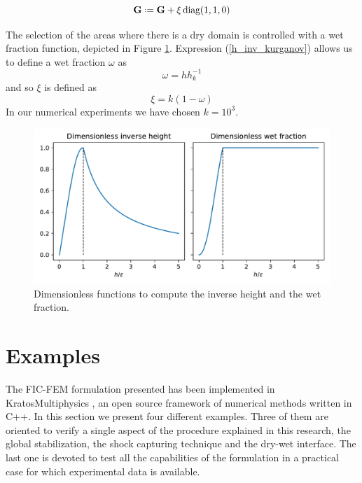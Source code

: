 \documentclass[a4paper,12pt]{elsarticle}
\newcommand{\defeq}{\mathrel{\vcenter{\baselineskip0.5ex\lineskiplimit0pt\hbox{\scriptsize.}\hbox{\scriptsize.}}}=}
\begin{document}
\begin{equation}
\mathbf{G} \defeq \mathbf{G} + \xi\,\text{diag}(1, 1, 0)
\end{equation}

The selection of the areas where there is a dry domain is controlled with a wet fraction function, depicted in Figure \ref{inverse_heihgt}. Expression (\ref{h_inv_kurganov}) allows us to define a wet fraction $\omega$ as
\begin{equation}
\omega = hh^{-1}_k
\end{equation}
and so $\xi$ is defined as
\begin{equation}
\xi = k(1-\omega)
\end{equation}
In our numerical experiments we have chosen $k=10^3$.


\begin{figure}
    \centering
    \includegraphics[width=\textwidth]{img/fig/inverse_height.pdf}
    \caption{Dimensionless functions to compute the  inverse height and the wet fraction.}
    \label{inverse_heihgt}
\end{figure}


\section{Examples} \label{sec:examples}

The FIC-FEM formulation presented has been implemented in KratosMultiphysics \cite{dadvand2010, dadvand2013}, an open source framework of numerical methods written in C++.
In this section we present four different examples. Three of them are oriented to verify a single aspect of the procedure explained in this research, the global stabilization, the shock capturing technique and the dry-wet interface.
The last one is devoted to test all the capabilities of the formulation in a practical case for which experimental data is available.
\end{document}
